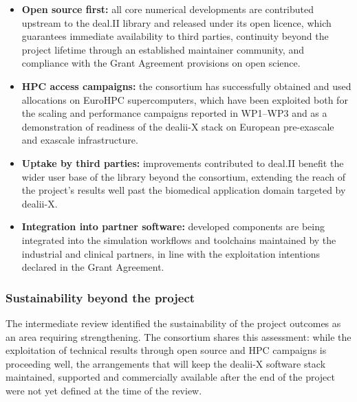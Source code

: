 \documentclass[a4paper,12pt, numbers]{article}
\begin{document}
\begin{itemize}[left=1em, itemsep=0pt, topsep=0pt]
\item \textbf{Open source first:} all core numerical developments are contributed upstream to the deal.II library and released under its open licence, which guarantees immediate availability to third parties, continuity beyond the project lifetime through an established maintainer community, and compliance with the Grant Agreement provisions on open science.
\item \textbf{HPC access campaigns:} the consortium has successfully obtained and used allocations on EuroHPC supercomputers, which have been exploited both for the scaling and performance campaigns reported in WP1--WP3 and as a demonstration of readiness of the dealii-X stack on European pre-exascale and exascale infrastructure.
\item \textbf{Uptake by third parties:} improvements contributed to deal.II benefit the wider user base of the library beyond the consortium, extending the reach of the project's results well past the biomedical application domain targeted by \mbox{dealii-X}.
\item \textbf{Integration into partner software:} developed components are being integrated into the simulation workflows and toolchains maintained by the industrial and clinical partners, in line with the exploitation intentions declared in the Grant Agreement.
\end{itemize}

\subsubsection*{Sustainability beyond the project}

The intermediate review identified the sustainability of the project outcomes as an area
requiring strengthening. The consortium shares this assessment: while the exploitation of
technical results through open source and HPC campaigns is proceeding well, the
arrangements that will keep the dealii-X software stack maintained, supported and
commercially available after the end of the project were not yet defined at the time of the
review. 
\end{document}
